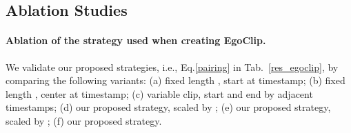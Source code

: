 \documentclass{article}
\newcommand{\dataset}{EgoClip}
\newcommand{\eval}{EgoMCQ}
\newcommand{\epic}{EPIC-KITCHENS-100}
\begin{document}
\begin{table}[!t]
\small
\centering
\setlength{\tabcolsep}{3pt}
\vspace{-.8em}
\centering
\vspace{.5em}
\caption{Results on our development set \eval~and video-text retrieval on \epic~when using different strategies in the creation of \dataset, where , ,  are defined in Eq.~\ref{pairing}.\\
In all experiments, we bold the \textbf{best results} and underlined \underline{the second best results}.
}
\vspace{-2.4em}
\label{res_egoclip}
\end{table} \subsection{Ablation Studies}
\paragraph{Ablation of the strategy used when creating \dataset.}
We validate our proposed strategies, i.e., Eq.\ref{pairing} in Tab.~\ref{res_egoclip}, by comparing the following variants:
(a) fixed length , start at timestamp;
(b) fixed length , center at timestamp;
(c) variable clip, start and end by adjacent timestamps;
(d) our proposed strategy, scaled by ;
(e) our proposed strategy, scaled by ;
(f) our proposed strategy.
\end{document}
